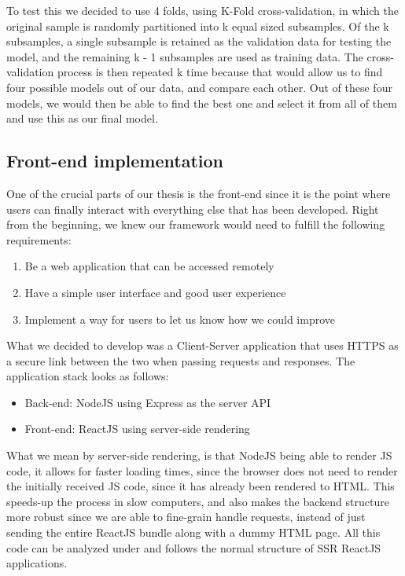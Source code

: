 To test this we decided to use 4 folds, using K-Fold cross-validation, in which the original sample is randomly partitioned into k equal sized subsamples. Of the k subsamples, a single subsample is retained as the validation data for testing the model, and the remaining k - 1 subsamples are used as training data. The cross-validation process is then repeated k time because that would allow us to find four possible models out of our data, and compare each other. Out of these four models, we would then be able to find the best one and select it from all of them and use this as our final model.

\subsection{Front-end implementation}

One of the crucial parts of our thesis is the front-end since it is the point where users can finally interact with everything else that has been developed. Right from the beginning, we knew our framework would need to fulfill the following requirements:

\begin{enumerate}
	\item Be a web application that can be accessed remotely
	\item Have a simple user interface and good user experience
	\item Implement a way for users to let us know how we could improve
\end{enumerate}

What we decided to develop was a Client-Server application that uses HTTPS as a secure link between the two when passing requests and responses. The application stack looks as follows:

\begin{itemize}
	\item Back-end: NodeJS using Express as the server API 
	\item Front-end: ReactJS using server-side rendering
\end{itemize}

What we mean by server-side rendering, is that NodeJS being able to render JS code, it allows for faster loading times, since the browser does not need to render the initially received JS code, since it has already been rendered to HTML. This speeds-up the process in slow computers, and also makes the backend structure more robust since we are able to fine-grain handle requests, instead of just sending the entire ReactJS bundle along with a dummy HTML page. All this code can be analyzed under \parencite{ricardo} and follows the normal structure of SSR ReactJS applications.

